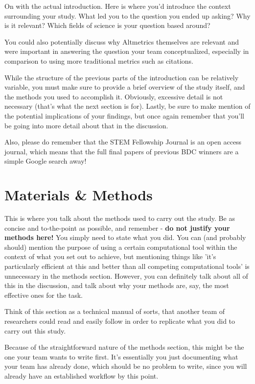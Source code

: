 \documentclass[12pt,twocolumn,letterpaper]{article}
\begin{document}
On with the actual introduction. Here is where you'd introduce the context surrounding your study. What led you to the question you ended up asking? Why is it relevant? Which fields of science is your question based around?

You could also potentially discuss why Altmetrics themselves are relevant and were important in answering the question your team conceptualized, especially in comparison to using more traditional metrics such as citations.

While the structure of the previous parts of the introduction can be relatively variable, you must make sure to provide a brief overview of the study itself, and the methods you used to accomplish it. Obviously, excessive detail is not necessary (that's what the next section is for). Lastly, be sure to make mention of the potential implications of your findings, but once again remember that you'll be going into more detail about that in the discussion.

Also, please do remember that the STEM Fellowship Journal is an open access journal, which means that the full final papers of previous BDC winners are a simple Google search away!

\section{Materials \& Methods}

This is where you talk about the methods used to carry out the study. Be as concise and to-the-point as possible, and remember - \textbf{do not justify your methods here!} You simply need to state what you did. You can (and probably should) mention the purpose of using a certain computational tool within the context of what you set out to achieve, but mentioning things like 'it's particularly efficient at this and better than all competing computational tools' is unnecessary in the methods section. However, you can definitely talk about all of this in the discussion, and talk about why your methods are, say, the most effective ones for the task.

Think of this section as a technical manual of sorts, that another team of researchers could read and easily follow in order to replicate what you did to carry out this study.

Because of the straightforward nature of the methods section, this might be the one your team wants to write first. It's essentially you just documenting what your team has already done, which should be no problem to write, since you will already have an established workflow by this point.
\end{document}
